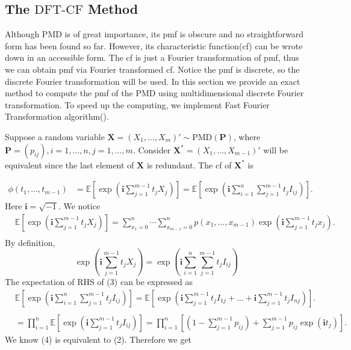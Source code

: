 \documentclass[12pt]{article}
\newcommand{\EE}{\mathbb{E}}
\newcommand{\Pmat}{\mathbf{P}}
\newcommand{\ivec}{{\boldsymbol{i}}}
\newcommand{\PMD}{\textrm{PMD}}
\newcommand{\Xvec}{\boldsymbol{X}}
\newcommand{\dft}{{\textrm{DFT-CF}}}
\begin{document}
\subsection{The $\dft$ Method}
Although $\PMD$ is of great importance, its pmf is obscure and no straightforward form has been found so far. However, its characteristic function(cf) can be wrote down in an accessible form. The cf is just a Fourier transformation of pmf, thus we can obtain pmf via Fourier transformed cf. Notice the pmf is discrete, so the discrete Fourier transformation will be used. In this section we provide an exact method to compute the pmf of the PMD using multidimensional discrete Fourier transformation. To speed up the computing, we implement Fast Fourier Transformation algorithm().

Suppose a random variable $\Xvec =  (X_1, \dots, X_{m})' \sim \PMD(\Pmat)$, where $\Pmat = (p_{ij}), i=1,\dots,n,j=1,\dots,m$. Consider $\Xvec^{\ast} = (X_1, \dots, X_{m-1})'$ will be equivalent since the last element of $\Xvec$ is redundant. The cf of $\Xvec^{\ast}$ is

\begin{align}
\phi(t_1, \dots, t_{m-1}) & = \EE\left[\exp\left(\ivec\sum_{j=1}^{m-1}t_jX_j\right)\right]=\EE\left[\exp\left(\ivec\sum_{i = 1}^n \sum_{j=1}^{m-1}t_j I_{ij}\right)\right].
\end{align}
Here $\ivec=\sqrt{-1}$. We notice
\begin{equation}
\begin{split}
  &\EE\left[\exp\left(\ivec\sum_{j=1}^{m-1}t_jX_j\right)\right] = \sum_{x_1 = 0}^{n}\cdots \sum_{x_{m-1} = 0}^n p(x_1,\ldots,x_{m-1})\exp\left(\ivec\sum_{j=1}^{m-1}t_jx_j\right).\\
\end{split}
\end{equation}
By definition,
\begin{equation}
\exp\left(\ivec\sum_{j=1}^{m-1}t_jX_j\right)= \exp\left(\ivec\sum_{i = 1}^n \sum_{j=1}^{m-1}t_j I_{ij}\right)
\end{equation}
The expectation of RHS of (3) can be expressed as
\begin{equation}
\begin{split}
  &\EE\left[\exp\left(\ivec\sum_{i = 1}^n \sum_{j=1}^{m-1}t_j I_{ij}\right)\right] = \EE\left[ \exp\left( \ivec\sum_{j=1}^{m-1} t_jI_{1j} + \dots + \ivec\sum_{j=1}^{m-1} t_jI_{nj}\right)\right].\\
  \\
  & = \prod_{i=1}^n \EE\left[ \exp\left( \ivec \sum_{j=1}^{m-1} t_j I_{ij}\right)\right] = \prod_{i=1}^n \left[(1 - \sum_{j=1}^{m-1}p_{ij})+\sum_{j=1}^{m-1}p_{ij}\exp(\ivec t_j)\right].
\end{split}
\end{equation}
We know (4) is equivalent to (2). Therefore we get
\end{document}
